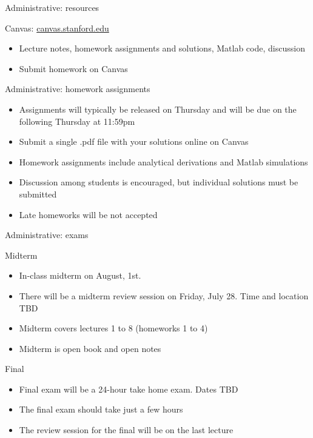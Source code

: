 \documentclass[10pt, handout]{beamer}
\begin{document}
\begin{frame}{Administrative: resources}
\begin{block}{Canvas: \href{https://canvas.stanford.edu}{canvas.stanford.edu}}
	\begin{itemize}
		\item Lecture notes, homework assignments and solutions, Matlab code, discussion
		\item Submit homework on Canvas
	\end{itemize}
\end{block}

\end{frame}

%
\begin{frame}{Administrative: homework assignments}

\begin{itemize}
	\item Assignments will typically be released on Thursday and will be due on the following Thursday at 11:59pm
	\item Submit a single .pdf file with your solutions online on Canvas
	\item Homework assignments include analytical derivations and Matlab simulations
	\item Discussion among students is encouraged, but individual solutions must be submitted
	\item Late homeworks will be not accepted
\end{itemize}

\end{frame}

%
\begin{frame}{Administrative: exams}
	
\begin{block}{Midterm}
	\begin{itemize} 
	\item In-class midterm on August, 1st. 
	\item There will be a midterm review session on Friday, July 28. Time and location TBD
	\item Midterm covers lectures 1 to 8 (homeworks 1 to 4)
	\item Midterm is open book and open notes
	\end{itemize}
\end{block}

\begin{block}{Final}
	\begin{itemize} 
	\item Final exam will be a 24-hour take home exam. Dates TBD
	\item The final exam should take just a few hours
	\item The review session for the final will be on the last lecture
	\end{itemize}
\end{block}

\end{frame}
\end{document}
